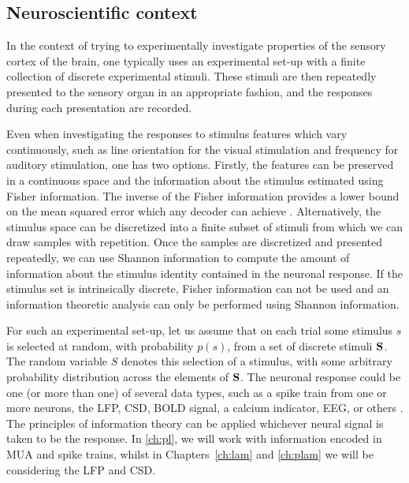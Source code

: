 \subsection{Neuroscientific context}

In the context of trying to experimentally investigate properties of the sensory cortex of the brain, one typically uses an experimental set-up with a finite collection of discrete experimental stimuli.
These stimuli are then repeatedly presented to the sensory organ in an appropriate fashion, and the responses during each presentation are recorded.

Even when investigating the responses to stimulus features which vary continuously, such as line orientation for the visual stimulation and frequency for auditory stimulation, one has two options.
Firstly, the features can be preserved in a continuous space and the information about the stimulus estimated using Fisher information. The inverse of the Fisher information provides a lower bound on the mean squared error which any decoder can achieve \citep{Quiroga2009}.
Alternatively, the stimulus space can be discretized into a finite subset of stimuli from which we can draw samples with repetition.
Once the samples are discretized and presented repeatedly, we can use Shannon information to compute the amount of information about the stimulus identity contained in the neuronal response.
If the stimulus set is intrinsically discrete, Fisher information can not be used and an information theoretic analysis can only be performed using Shannon information.

For such an experimental set-up, let us assume that on each trial some stimulus $s$ is selected at random, with probability $p(s)$, from a set of discrete stimuli $\mathbf{S}$.
The random variable $S$ denotes this selection of a stimulus, with some arbitrary probability distribution across the elements of $\mathbf{S}$.
The neuronal response could be one (or more than one) of several data types, such as a spike train from one or more neurons, the \ac{LFP}, \ac{CSD}, \ac{BOLD} signal, a calcium indicator, \ac{EEG}, or others \citep{Magri2009,Quiroga2009}.
The principles of information theory can be applied whichever neural signal is taken to be the response.
In \autoref{ch:pl}, we will work with information encoded in \ac{MUA} and spike trains, whilst in Chapters~\ref{ch:lam} and \ref{ch:plam} we will be considering the \ac{LFP} and \ac{CSD}.

